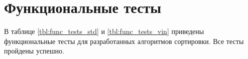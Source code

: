 \clearpage


\clearpage


\clearpage


\clearpage



\clearpage



\clearpage

\section{Функциональные тесты}

В таблице \ref{tbl:func_tests_std} и \ref{tbl:func_tests_vin} приведены функциональные тесты для разработанных алгоритмов сортировки. Все тесты пройдены успешно.

